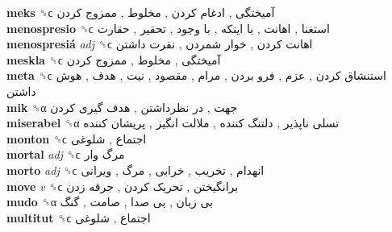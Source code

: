 \textbf{meks} ␝ϲ   آمیختگی ,  ادغام کردن ,  مخلوط ,  ممزوج کردن   \\
\textbf{menospresio} ␝ϲ   استغنا ,  اهانت ,  با اینکه ,  با وجود ,  تحقیر ,  حقارت   \\
\textbf{menospresiá} \emph{adj}  ␝ϲ   اهانت کردن ,  خوار شمردن ,  نفرت داشتن   \\
\textbf{meskla} ␝ϲ   آمیختگی ,  مخلوط ,  ممزوج کردن   \\
\textbf{meta} ␝ϲ   استنشاق کردن ,  عزم ,  فرو بردن ,  مرام ,  مقصود ,  نیت ,  هدف ,  هوش داشتن   \\
\textbf{mik} ␝α   جهت ,  در نظرداشتن ,  هدف گیری کردن   \\
\textbf{miserabel} ␝α   تسلی ناپذیر ,  دلتنگ کننده ,  ملالت انگیز ,  پریشان کننده   \\
\textbf{monton} ␝ϲ   اجتماع ,  شلوغی   \\
\textbf{mortal} \emph{adj}  ␝ϲ   مرگ وار   \\
\textbf{morto} \emph{adj}  ␝ϲ   انهدام ,  تخریب ,  خرابی ,  مرگ ,  ویرانی   \\
\textbf{move} \emph{v}  ␝ϲ   برانگیختن ,  تحریک کردن ,  جرقه زدن   \\
\textbf{mudo} ␝α   بی زبان ,  بی صدا ,  صامت ,  گنگ   \\
\textbf{multitut} ␝ϲ   اجتماع ,  شلوغی   \\
